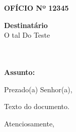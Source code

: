 \documentclass[a4paper,12pt]{article}
\begin{document}
\begin{center}
    \textbf{OFÍCIO Nº 12345}
\end{center}

\vspace{1cm}

\begin{flushright}
    \textbf{Destinatário} \\
    O tal Do Teste \\
     \\
     \\
    
\end{flushright}

\vspace{1cm}

\textbf{Assunto:} 

\vspace{1cm}

Prezado(a) Senhor(a),

\bigskip

Texto do documento.

\bigskip

Atenciosamente,

\vspace{1cm}

\hrulefill \\
 \\
 \\
 \\
\end{document}
